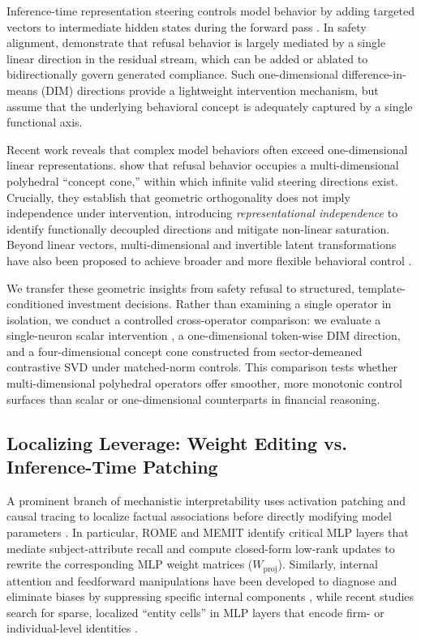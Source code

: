 \documentclass[11pt]{article}
\begin{document}
Inference-time representation steering controls model behavior by adding targeted vectors to
intermediate hidden states during the forward pass \citep{turner2023actadd,zou2023rep,panickssery2024caa}.
In safety alignment, \citet{arditi2024refusallanguagemodelsmediated} demonstrate that refusal behavior
is largely mediated by a single linear direction in the residual stream, which can be added or
ablated to bidirectionally govern generated compliance. Such one-dimensional difference-in-means
(DIM) directions provide a lightweight intervention mechanism, but assume that the underlying
behavioral concept is adequately captured by a single functional axis.

Recent work reveals that complex model behaviors often exceed one-dimensional linear representations.
\citet{wollschläger2026geometryrefusallargelanguage} show that refusal behavior occupies a
multi-dimensional polyhedral ``concept cone,'' within which infinite valid steering directions exist.
Crucially, they establish that geometric orthogonality does not imply independence under intervention,
introducing \emph{representational independence} to identify functionally decoupled directions and
mitigate non-linear saturation. Beyond linear vectors, multi-dimensional and invertible latent
transformations have also been proposed to achieve broader and more flexible behavioral control
\citep{nguyen2026beyond}.

We transfer these geometric insights from safety refusal to structured, template-conditioned
investment decisions. Rather than examining a single operator in isolation, we conduct a controlled
cross-operator comparison: we evaluate a single-neuron scalar intervention \citep{park2026dial}, a
one-dimensional token-wise DIM direction, and a four-dimensional concept cone constructed from
sector-demeaned contrastive SVD under matched-norm controls. This comparison tests whether
multi-dimensional polyhedral operators offer smoother, more monotonic control surfaces than
scalar or one-dimensional counterparts in financial reasoning.

\subsection{Localizing Leverage: Weight Editing vs. Inference-Time Patching}

A prominent branch of mechanistic interpretability uses activation patching and causal tracing to
localize factual associations before directly modifying model parameters
\citep{meng2023locating,meng2023mass}. In particular, ROME \citep{meng2023locating} and MEMIT
\citep{meng2023mass} identify critical MLP layers that mediate subject-attribute recall and compute
closed-form low-rank updates to rewrite the corresponding MLP weight matrices ($W_{\text{proj}}$).
Similarly, internal attention and feedforward manipulations have been developed to diagnose and
eliminate biases by suppressing specific internal components \citep{zhou2024unibias}, while recent
studies search for sparse, localized ``entity cells'' in MLP layers that encode firm- or
individual-level identities \citep{yona2026friends}.
\end{document}
